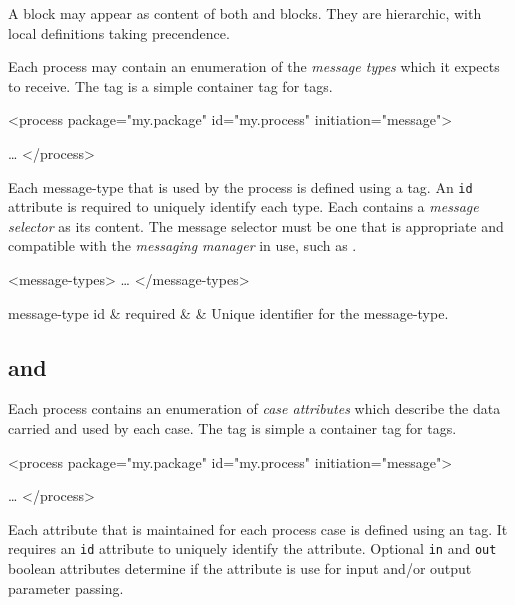 A  block may appear as content of both
 and  blocks.  They are hierarchic, with
local definitions taking precendence.

Each process may contain an enumeration of the \emph{message types}
which it expects to receive.  The  tag is a simple
container tag for  tags.  

\begin{codelisting}
<process package="my.package"
         id="my.process"
         initiation="message">

         \dots
</process>
\end{codelisting}

Each message-type that is used by the process is defined using
a  tag.  An \verb|id| attribute is required
to uniquely identify each type.  Each  
contains a \emph{message selector} as its content.  The
message selector must be one that is appropriate and compatible
with the \emph{messaging manager} in use, such as
.

\begin{codelisting}
<message-types>
        \dots
</message-types>
\end{codelisting}

\begin{attrDefs}{message-type}
id		&	required	&			& Unique identifier for the message-type.
\end{attrDefs}

\subsection{ and }

Each process contains an enumeration of \emph{case attributes} which
describe the data carried and used by each case.  The 
tag is simple a container tag for  tags.

\begin{codelisting}
<process package="my.package"
         id="my.process"
         initiation="message">

         \dots
</process>
\end{codelisting}

Each attribute that is maintained for each process case is defined
using an  tag.  It requires an \verb|id| attribute to
uniquely identify the attribute.  Optional \verb|in| and \verb|out|
boolean attributes determine if the attribute is use for input 
and/or output parameter passing.

